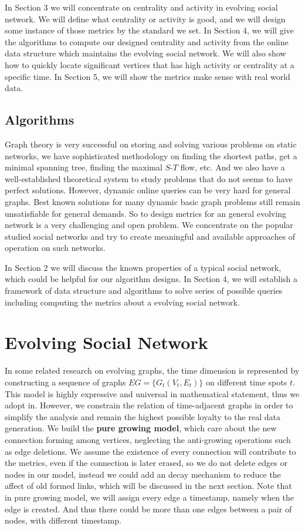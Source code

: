 \documentclass[12pt,abstract=true]{scrartcl}
\numberwithin{equation}{section}
\theoremstyle{definition}   \newtheorem{definition}{Definition}[section]
\theoremstyle{plain}        \newtheorem{theorem}{Theorem}[section]
\theoremstyle{plain}        \newtheorem{observation}{Observation}[section]
\theoremstyle{plain}        \newtheorem{fact}{Fact}[section]
\theoremstyle{plain}        \newtheorem{claim}{Claim}[section]
\theoremstyle{plain}        \newtheorem{lemma}[theorem]{Lemma}
\theoremstyle{plain}        \newtheorem{corollary}[theorem]{Corollary}
\theoremstyle{remark}       \newtheorem{example}{Example}[section]
\theoremstyle{remark}       \newtheorem{remark}{Remark}[section]
\begin{document}
In Section 3 we will concentrate on centrality and activity in evolving social
network. We will define what centrality or activity is good, and we will design
some instance of those metrics by the standard we set. In Section 4, we will
give the algorithms to compute our designed centrality and activity from the
online data structure which maintains the evolving social network. We will also
show how to quickly locate significant vertices that has high activity or
centrality at a specific time. In Section 5, we will show the metrics make
sense with real world data.

\subsection{Algorithms}
Graph theory is very successful on storing and solving various problems on
static networks, we have sophisticated methodology on finding the shortest
paths, get a minimal spanning tree, finding the maximal $S$-$T$ flow, etc.
And we also have a well-established theoretical system to study problems that
do not seems to have perfect solutions. However, dynamic online queries can be
very hard for general graphs. Best known solutions for many dynamic basic graph
problems still remain unsatisfiable for general demands. So to design metrics
for an general evolving network is a very challenging and open problem. We
concentrate on the popular studied social networks and try to create meaningful
and available approaches of operation on such networks.

In Section 2 we will discuss the known properties of a typical social network,
which could be helpful for our algorithm designs. In Section 4, we will
establish a framework of data structure and algorithms to solve series of
possible queries including computing the metrics about a evolving social
network.

\section{Evolving Social Network}
In some related research on evolving graphs, the time dimension is represented
by constructing a sequence of graphs $EG=\{G_t(V_t,E_t)\}$ on different time
spots $t$. This model is highly expressive and universal in mathematical
statement, thus we adopt in. However, we constrain the relation of
time-adjacent graphs in order to simplify the analysis and remain the highest
possible loyalty to the real data generation. We build the \textbf{pure growing
model}, which care about the new connection forming among vertices, neglecting
the anti-growing operations such as edge deletions. We assume the existence of
every connection will contribute to the metrics, even if the connection is
later erased, so we do not delete edges or nodes in our model, instead we could
add an decay mechanism to reduce the affect of old formed links, which will be
discussed in the next section. Note that in pure growing model, we will assign
every edge a timestamp, namely when the edge is created. And thus there could
be more than one edges between a pair of nodes, with different timestamp.
\end{document}
